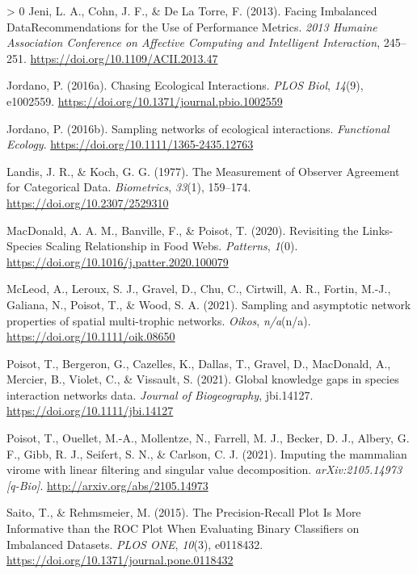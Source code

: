 \documentclass[10pt,oneside]{article}
\newlength{\cslhangindent}
\newenvironment{CSLReferences}[3] %
 {%
  \setlength{\parindent}{0pt}
  \ifodd #1 \everypar{\setlength{\hangindent}{\cslhangindent}}\ignorespaces\fi
  \ifnum #2 > 0
  \setlength{\parskip}{#2\baselineskip}
  \fi
 }%
 {}
\begin{document}
\begin{CSLReferences}{1}{0}
\leavevmode\hypertarget{ref-Jeni2013FacImb}{}%
Jeni, L. A., Cohn, J. F., \& De La Torre, F. (2013). Facing Imbalanced
DataRecommendations for the Use of Performance Metrics. \emph{2013
Humaine Association Conference on Affective Computing and Intelligent
Interaction}, 245--251. \url{https://doi.org/10.1109/ACII.2013.47}

\leavevmode\hypertarget{ref-Jordano2016ChaEco}{}%
Jordano, P. (2016a). Chasing Ecological Interactions. \emph{PLOS Biol},
\emph{14}(9), e1002559.
\url{https://doi.org/10.1371/journal.pbio.1002559}

\leavevmode\hypertarget{ref-Jordano2016SamNet}{}%
Jordano, P. (2016b). Sampling networks of ecological interactions.
\emph{Functional Ecology}. \url{https://doi.org/10.1111/1365-2435.12763}

\leavevmode\hypertarget{ref-Landis1977MeaObs}{}%
Landis, J. R., \& Koch, G. G. (1977). The Measurement of Observer
Agreement for Categorical Data. \emph{Biometrics}, \emph{33}(1),
159--174. \url{https://doi.org/10.2307/2529310}

\leavevmode\hypertarget{ref-MacDonald2020RevLin}{}%
MacDonald, A. A. M., Banville, F., \& Poisot, T. (2020). Revisiting the
Links-Species Scaling Relationship in Food Webs. \emph{Patterns},
\emph{1}(0). \url{https://doi.org/10.1016/j.patter.2020.100079}

\leavevmode\hypertarget{ref-McLeod2021SamAsy}{}%
McLeod, A., Leroux, S. J., Gravel, D., Chu, C., Cirtwill, A. R., Fortin,
M.-J., Galiana, N., Poisot, T., \& Wood, S. A. (2021). Sampling and
asymptotic network properties of spatial multi-trophic networks.
\emph{Oikos}, \emph{n/a}(n/a). \url{https://doi.org/10.1111/oik.08650}

\leavevmode\hypertarget{ref-Poisot2021GloKno}{}%
Poisot, T., Bergeron, G., Cazelles, K., Dallas, T., Gravel, D.,
MacDonald, A., Mercier, B., Violet, C., \& Vissault, S. (2021). Global
knowledge gaps in species interaction networks data. \emph{Journal of
Biogeography}, jbi.14127. \url{https://doi.org/10.1111/jbi.14127}

\leavevmode\hypertarget{ref-Poisot2021ImpMam}{}%
Poisot, T., Ouellet, M.-A., Mollentze, N., Farrell, M. J., Becker, D.
J., Albery, G. F., Gibb, R. J., Seifert, S. N., \& Carlson, C. J.
(2021). Imputing the mammalian virome with linear filtering and singular
value decomposition. \emph{arXiv:2105.14973 {[}q-Bio{]}}.
\url{http://arxiv.org/abs/2105.14973}

\leavevmode\hypertarget{ref-Saito2015PrePlo}{}%
Saito, T., \& Rehmsmeier, M. (2015). The Precision-Recall Plot Is More
Informative than the ROC Plot When Evaluating Binary Classifiers on
Imbalanced Datasets. \emph{PLOS ONE}, \emph{10}(3), e0118432.
\url{https://doi.org/10.1371/journal.pone.0118432}


\end{CSLReferences}
\end{document}
